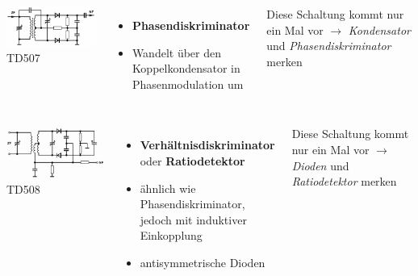 \begin{frame}
  \begin{columns}
    \includegraphics[width=\textwidth,height=.85\textheight,keepaspectratio]{a12/td507.png}\\
    {\tiny TD507}
    \begin{itemize}
      \item \textbf{Phasendiskriminator}
      \item Wandelt über den Koppelkondensator in Phasenmodulation um
    \end{itemize}
    {\small Diese Schaltung kommt nur ein Mal vor $\rightarrow$ \emph{Kondensator} und \emph{Phasendiskriminator} merken}
  \end{columns}
\end{frame}

\begin{frame}
  \begin{columns}
    \includegraphics[width=\textwidth,height=.85\textheight,keepaspectratio]{a12/td508.png}\\
    {\tiny TD508}
    \begin{itemize}
      \item \textbf{Verhältnisdiskriminator} oder \textbf{Ratiodetektor}
      \item ähnlich wie Phasendiskriminator, jedoch mit induktiver Einkopplung
      \item antisymmetrische Dioden
    \end{itemize}
    {\small Diese Schaltung kommt nur ein Mal vor $\rightarrow$ \emph{Dioden} und \emph{Ratiodetektor} merken}
  \end{columns}
\end{frame}

